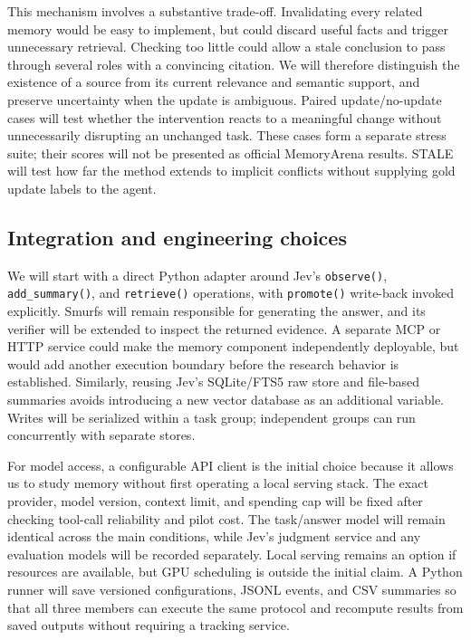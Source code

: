 \documentclass[a4paper,11pt]{article}
\begin{document}
This mechanism involves a substantive trade-off. Invalidating every related memory would be easy to implement, but could discard useful facts and trigger unnecessary retrieval. Checking too little could allow a stale conclusion to pass through several roles with a convincing citation. We will therefore distinguish the existence of a source from its current relevance and semantic support, and preserve uncertainty when the update is ambiguous. Paired update/no-update cases will test whether the intervention reacts to a meaningful change without unnecessarily disrupting an unchanged task. These cases form a separate stress suite; their scores will not be presented as official MemoryArena results. STALE will test how far the method extends to implicit conflicts without supplying gold update labels to the agent.\par

\subsection{Integration and engineering choices}
We will start with a direct Python adapter around Jev's {\small\texttt{observe()}}, {\small\texttt{add\_summary()}}, and {\small\texttt{retrieve()}} operations, with {\small\texttt{promote()}} write-back invoked explicitly. Smurfs will remain responsible for generating the answer, and its verifier will be extended to inspect the returned evidence. A separate MCP or HTTP service could make the memory component independently deployable, but would add another execution boundary before the research behavior is established. Similarly, reusing Jev's SQLite/FTS5 raw store and file-based summaries avoids introducing a new vector database as an additional variable. Writes will be serialized within a task group; independent groups can run concurrently with separate stores.\par

For model access, a configurable API client is the initial choice because it allows us to study memory without first operating a local serving stack. The exact provider, model version, context limit, and spending cap will be fixed after checking tool-call reliability and pilot cost. The task/answer model will remain identical across the main conditions, while Jev's judgment service and any evaluation models will be recorded separately. Local serving remains an option if resources are available, but GPU scheduling is outside the initial claim. A Python runner will save versioned configurations, JSONL events, and CSV summaries so that all three members can execute the same protocol and recompute results from saved outputs without requiring a tracking service.\par
\end{document}
